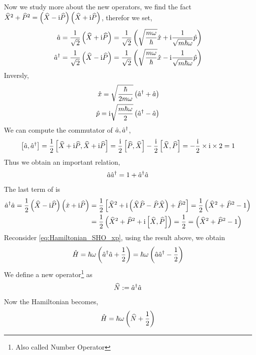 Now we study more about the new operators, we find the fact $\widehat{X}^2 + \widehat{P}^2 = \left(\widehat{X} - \mathrm{i} \widehat{P}\right) \left(\widehat{X} + \mathrm{i} \widehat{P}\right)$, therefor we set, 
\begin{align}
    \hat{a} &= \frac{1}{\sqrt{2}} \left(\widehat{X} + \mathrm{i} \widehat{P}\right) = \frac{1}{\sqrt{2}} \left( \sqrt{\frac{m \omega}{\hbar}} \hat{x} + \mathrm{i} \frac{1}{\sqrt{m \hbar \omega}} \hat{p} \right)\\
    \hat{a}^ \dag & = \frac{1}{\sqrt{2}} \left(\widehat{X} - \mathrm{i} \widehat{P}\right) = \frac{1}{\sqrt{2}} \left( \sqrt{\frac{m \omega}{\hbar}} \hat{x} - \mathrm{i} \frac{1}{\sqrt{m \hbar \omega}} \hat{p} \right)
\end{align}
Inversly,
\begin{align}
    \hat{x} = \sqrt{\frac{\hbar}{2m\omega}} \left(\hat{a}^ \dag+ \hat{a}\right) \label{eq:ox_as_aadag} \\ 
    \hat{p} = \mathrm{i} \sqrt{\frac{m \hbar \omega}{2}} \left(\hat{a}^ \dag - \hat{a}\right) \label{eq:op_as_aadag}
\end{align}
We can compute the commutator of $\hat{a},\hat{a}^ \dag$, 
\begin{eqnarray}
    \left[ \hat{a} , \hat{a}^ \dag \right] = \frac{1}{2} \left[ \widehat{X} + \mathrm{i} \widehat{P} , \widehat{X} + \mathrm{i} \widehat{P} \right] = \frac{\mathrm{i}}{2} \left[ \widehat{P} , \widehat{X} \right] - \frac{\mathrm{i}}{2} \left[ \widehat{X} , \widehat{P} \right] = -\frac{ \mathrm{i}}{2} \times \mathrm{i} \times 2 = 1
\end{eqnarray}
Thus we obtain an important relation,
\begin{eqnarray}
    \hat{a} \hat{a}^ \dag = 1 + \hat{a}^ \dag \hat{a} 
\end{eqnarray}
The last term of \rhs is 
\begin{align}
    \hat{a}^ \dag \hat{a} = \frac{1}{2} \left(\widehat{X} - \mathrm{i} \widehat{P}\right) \left( \hat{x} + \mathrm{i} \widehat{P} \right) &= \frac{1}{2} \left[\widehat{X}^2 + \mathrm{i}\left( \widehat{X} \widehat{P} - \widehat{P} \widehat{X} \right) + \widehat{P}^2 \right] = \frac{1}{2} \left( \widehat{X}^2 + \widehat{P}^2 -1 \right) \\
    &= \frac{1}{2} \left(\widehat{X}^2+ \widehat{P}^2 + \mathrm{i} \left[ \widehat{X} , \widehat{P} \right]\right) = \frac{1}{2} = \left(\widehat{X}^2 + \widehat{P}^2 -1\right) 
\end{align}
Reconsider \cref{eq:Hamiltonian_SHO_xp}, using the result above, we obtain
\begin{align}
    \hat{H} = \hbar \omega \left(\hat{a}^ \dag \hat{a} + \frac{1}{2}\right) = \hbar \omega \left( \hat{a} \hat{a}^ \dag - \frac{1}{2} \right) \label{eq:Hamiltonian_SHO_aadag}
\end{align}
We define a new operator\footnote{Also called Number Operator} as
\begin{align}
    \widehat{N} := \hat{a}^ \dag \hat{a} \label{eq:number_operator}
\end{align}
Now the Hamiltonian becomes,
\begin{align}
    \hat{H} = \hbar \omega \left( \widehat{N} + \frac{1}{2} \right)\label{eq:Hamiltonian_SHO_number}
\end{align}
